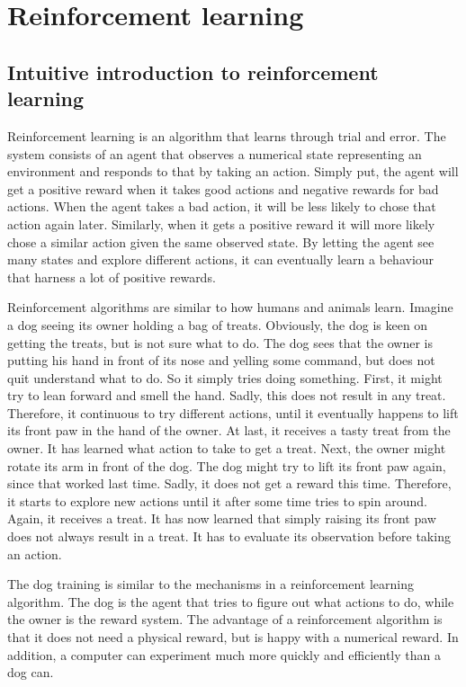 \documentclass[class=book, crop=false, 11pt]{standalone}
\begin{document}
\chapter{Reinforcement learning}
\section{Intuitive introduction to reinforcement learning}
Reinforcement learning is an algorithm that learns through trial and error. The system consists of an agent that observes a numerical state representing an environment and responds to that by taking an action. Simply put, the agent will get a positive reward when it takes good actions and negative rewards for bad actions. When the agent takes a bad action, it will be less likely to chose that action again later. Similarly, when it gets a positive reward it will more likely chose a similar action given the same observed state. By letting the agent see many states and explore different actions, it can eventually learn a behaviour that harness a lot of positive rewards. 

Reinforcement algorithms are similar to how humans and animals learn. Imagine a dog seeing its owner holding a bag of treats. Obviously, the dog is keen on getting the treats, but is not sure what to do. The dog sees that the owner is putting his hand in front of its nose and yelling some command, but does not quit understand what to do. So it simply tries doing something. First, it might try to lean forward and smell the hand. Sadly, this does not result in any treat. Therefore, it continuous to try different actions, until it eventually happens to lift its front paw in the hand of the owner. At last, it receives a tasty treat from the owner. It has learned what action to take to get a treat. Next, the owner might rotate its arm in front of the dog. The dog might try to lift its front paw again, since that worked last time. Sadly, it does not get a reward this time. Therefore, it starts to explore new actions until it after some time tries to spin around. Again, it receives a treat. It has now learned that simply raising its front paw does not always result in a treat. It has to evaluate its observation before taking an action. 

The dog training is similar to the mechanisms in a reinforcement learning algorithm. The dog is the agent that tries to figure out what actions to do, while the owner is the reward system. The advantage of a reinforcement algorithm is that it does not need a physical reward, but is happy with a numerical reward. In addition, a computer can experiment much more quickly and efficiently than a dog can. 
\end{document}
